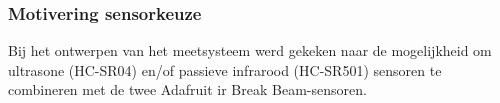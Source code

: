 






\subsubsection{Motivering sensorkeuze}
Bij het ontwerpen van het meetsysteem werd gekeken naar de mogelijkheid om ultrasone (HC-SR04) en/of passieve infrarood (HC-SR501) sensoren te combineren met de twee Adafruit \gls{ir} Break Beam-sensoren. \\

